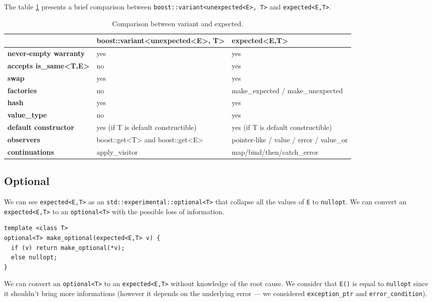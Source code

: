 \documentclass[a4paper,10pt]{article}
\newcommand{\cpp}[1]{\lstinline{#1}}
\begin{document}
The table \ref{comp-variant} presents a brief comparison between \cpp{boost::variant<unexpected<E>, T>} and \cpp{expected<E,T>}.

\begin{table}[h!]
\bgroup
\def\arraystretch{1.5}
\begin{tabular}
{|l|>{\raggedright\arraybackslash}p{6cm}|>{\raggedright\arraybackslash}p{6cm}|}
\hline
                    & \textbf{boost::variant<unexpected<E>, T>} & \textbf{expected<E,T>}  \\
\hline
\textbf{never-empty warranty} & yes & yes \\
\hline
\textbf{accepts is_same<T,E>} & no & yes \\
\hline
\textbf{swap} & yes & yes \\
\hline
\textbf{factories} & no & make\_expected / make\_unexpected  \\
\hline
\textbf{hash} & yes & yes  \\
\hline
\textbf{value_type} & no & yes  \\
\hline
\textbf{default constructor} & yes (if T is default constructible) & yes (if T is default constructible)  \\
\hline
\textbf{observers} & boost::get<T> and boost::get<E> & pointer-like / value / error / value_or \\
\hline
\textbf{continuations} & apply_visitor & map/bind/then/catch_error  \\
\hline
\end{tabular}
\egroup
\caption{Comparison between variant and expected.}
\label{comp-variant}
\end{table}


\subsection{Optional}

We can see \cpp{expected<E,T>} as an \cpp{std::experimental::optional<T>} that collapse all the values of \cpp{E} to \cpp{nullopt}. We can convert an \cpp{expected<E,T>} to an \cpp{optional<T>} with the possible loss of information.

\begin{lstlisting}
template <class T>
optional<T> make_optional(expected<E,T> v) {
  if (v) return make_optional(*v);
  else nullopt;
}
\end{lstlisting}
\noindent
We can convert an \cpp{optional<T>} to an \cpp{expected<E,T>} without knowledge of the root cause. We consider that \cpp{E()} is equal to \cpp{nullopt} since it shouldn't bring more informations (however it depends on the underlying error --- we considered \cpp{exception_ptr} and \cpp{error_condition}).
\end{document}
